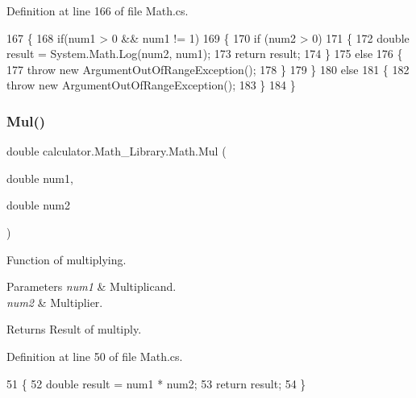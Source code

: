 Definition at line 166 of file Math.\+cs.


\begin{DoxyCode}
167         \{
168             \textcolor{keywordflow}{if}(num1 > 0 && num1 != 1)
169             \{
170                 \textcolor{keywordflow}{if} (num2 > 0)
171                 \{
172                     \textcolor{keywordtype}{double} result = System.Math.Log(num2, num1);
173                     \textcolor{keywordflow}{return} result;
174                 \}
175                 \textcolor{keywordflow}{else}
176                 \{
177                     \textcolor{keywordflow}{throw} \textcolor{keyword}{new} ArgumentOutOfRangeException();
178                 \}
179             \}
180             \textcolor{keywordflow}{else}
181             \{
182                 \textcolor{keywordflow}{throw} \textcolor{keyword}{new} ArgumentOutOfRangeException();
183             \}
184         \}
\end{DoxyCode}
\mbox{\label{classcalculator_1_1_math___library_1_1_math_a3e612f989e8e19033dad6146e771d56f}} 
\subsubsection{Mul()}
{\footnotesize\ttfamily double calculator.\+Math\+\_\+\+Library.\+Math.\+Mul (\begin{DoxyParamCaption}\item[{double}]{num1,  }\item[{double}]{num2 }\end{DoxyParamCaption})}



Function of multiplying. 


\begin{DoxyParams}{Parameters}
{\em num1} & Multiplicand.\\
\hline
{\em num2} & Multiplier.\\
\hline
\end{DoxyParams}
\begin{DoxyReturn}{Returns}
Result of multiply.
\end{DoxyReturn}


Definition at line 50 of file Math.\+cs.


\begin{DoxyCode}
51         \{
52             \textcolor{keywordtype}{double} result = num1 * num2;
53             \textcolor{keywordflow}{return} result;
54         \}
\end{DoxyCode}
\mbox{\label{classcalculator_1_1_math___library_1_1_math_a74ad51da75c3706539da40b3f21e3562}} 

